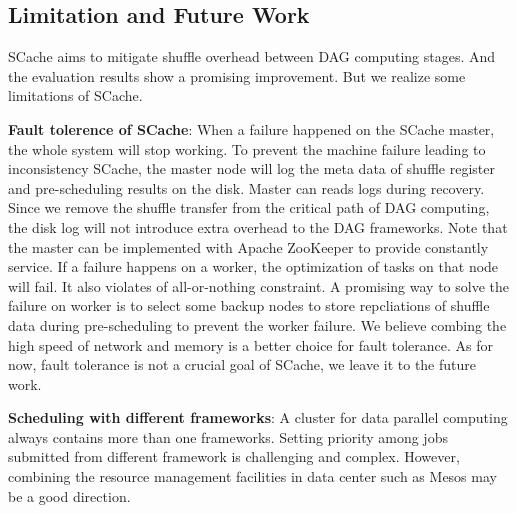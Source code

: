 \subsection{Limitation and Future Work}
SCache aims to mitigate shuffle overhead between DAG computing stages. And the evaluation results show a promising improvement. But we realize some limitations of SCache.

\textbf{Fault tolerence of SCache}: When a failure happened on the SCache master, the whole system will stop working. To prevent the machine failure leading to inconsistency SCache, the master node will log the meta data of shuffle register and pre-scheduling results on the disk. Master can reads logs during recovery. Since we remove the shuffle transfer from the critical path of DAG computing, the disk log will not introduce extra overhead to the DAG frameworks. Note that the master can be implemented with Apache ZooKeeper \cite{zookeeper} to provide constantly service. If a failure happens on a worker, the optimization of tasks on that node will fail. It also violates of all-or-nothing constraint. A promising way to solve the failure on worker is to select some backup nodes to store repcliations of shuffle data during pre-scheduling to prevent the worker failure. We believe combing the high speed of network and memory is a better choice for fault tolerance. As for now, fault tolerance is not a crucial goal of SCache,  we leave it to the future work.  

\textbf{Scheduling with different frameworks}: A cluster for data parallel computing always contains more than one frameworks. Setting priority among jobs submitted from different framework is challenging and complex. However, combining the resource management facilities in data center such as Mesos \cite{mesos} may be a good direction.